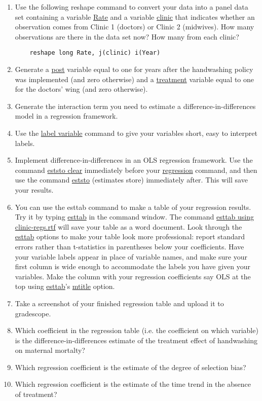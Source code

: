 \documentclass[11pt]{article}
\begin{document}
\begin{enumerate}
	
	\item Use the following reshape command to convert your data into a panel data set containing a variable \url{Rate} and a variable \url{clinic} that indicates whether an observation comes from Clinic 1 (doctors) or Clinic 2 (midwives).  How many observations are there in the data set now?  How many from each clinic?  
	
	\begin{verbatim}
	reshape long Rate, j(clinic) i(Year)
	\end{verbatim}
	
	
	\item Generate a \url{post} variable equal to one for years after the handwashing policy was implemented (and zero otherwise) and a \url{treatment} variable equal to one for the doctors' wing (and zero otherwise). 
	
	
	\item Generate the interaction term you need to estimate a difference-in-differences model in a regression framework.
	
	
	\item Use the \url{label variable} command to give your variables short, easy to interpret labels.
	
	
	\item Implement difference-in-differences in an OLS regression framework.  Use the command \url{eststo clear} immediately before your \url{regression} command, and then use the command \url{eststo} (estimates store) immediately after.  This will save your results.
	
	
	\item You can use the esttab command to make a table of your regression results.  Try it by typing \url{esttab} in the command window.  The command \url{esttab using clinic-regs.rtf} will save your table as a word document.  Look through the \url{esttab} options to make your table look more professional:  report standard errors rather than t-statistics in parentheses below your coefficients.  Have your variable labels appear in place of variable names, and make sure your first column is wide enough to accommodate the labels you have given your variables.  Make the column with your regression coefficients say OLS at the top using \url{esttab}'s \url{mtitle} option.  
	
	
	\item Take a screenshot of your finished regression table and upload it to gradescope.  
	
	
	\item Which coefficient in the regression table (i.e. the coefficient on which variable) is the difference-in-differences estimate of the treatment effect of handwashing on maternal mortalty?
	
	
	\item Which regression coefficient is the estimate of the degree of selection bias?
	
	
	\item Which regression coefficient is the estimate of the time trend in the absence of treatment?
	

\end{enumerate}
\end{document}
